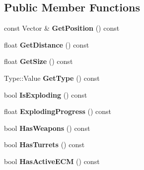\subsection*{Public Member Functions}
\begin{DoxyCompactItemize}
\item 
const Vector \& {\bfseries Get\+Position} () const \hypertarget{classRadar_1_1Track_a6dabd0befb8fa6f2c59dbf50b9a44966}{}\label{classRadar_1_1Track_a6dabd0befb8fa6f2c59dbf50b9a44966}

\item 
float {\bfseries Get\+Distance} () const \hypertarget{classRadar_1_1Track_a38076f12657b8424de36b6e9e437234e}{}\label{classRadar_1_1Track_a38076f12657b8424de36b6e9e437234e}

\item 
float {\bfseries Get\+Size} () const \hypertarget{classRadar_1_1Track_a9f255ac368b5785ee7a03118f17b9501}{}\label{classRadar_1_1Track_a9f255ac368b5785ee7a03118f17b9501}

\item 
Type\+::\+Value {\bfseries Get\+Type} () const \hypertarget{classRadar_1_1Track_aad82c5340aa4561228f9b3fcec30450d}{}\label{classRadar_1_1Track_aad82c5340aa4561228f9b3fcec30450d}

\item 
bool {\bfseries Is\+Exploding} () const \hypertarget{classRadar_1_1Track_a155ae290e6ce9b55912c3122f05faea2}{}\label{classRadar_1_1Track_a155ae290e6ce9b55912c3122f05faea2}

\item 
float {\bfseries Exploding\+Progress} () const \hypertarget{classRadar_1_1Track_a448792e055d7026f35e8ebc8761aeb7e}{}\label{classRadar_1_1Track_a448792e055d7026f35e8ebc8761aeb7e}

\item 
bool {\bfseries Has\+Weapons} () const \hypertarget{classRadar_1_1Track_aef6e8a1ab912ff13a179b4307111e000}{}\label{classRadar_1_1Track_aef6e8a1ab912ff13a179b4307111e000}

\item 
bool {\bfseries Has\+Turrets} () const \hypertarget{classRadar_1_1Track_a405c277d269eb1d74ccfd3d707cb22fe}{}\label{classRadar_1_1Track_a405c277d269eb1d74ccfd3d707cb22fe}

\item 
bool {\bfseries Has\+Active\+E\+CM} () const \hypertarget{classRadar_1_1Track_a9c88494943bead6f19c2dd5c20eac00a}{}\label{classRadar_1_1Track_a9c88494943bead6f19c2dd5c20eac00a}


\end{DoxyCompactItemize}
